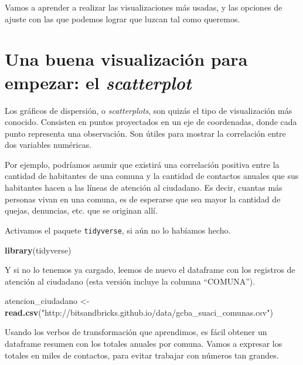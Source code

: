 \documentclass[spanish,]{book}
\newenvironment{Shaded}{\begin{snugshade}}{\end{snugshade}}
\newcommand{\KeywordTok}[1]{\textcolor[rgb]{0.13,0.29,0.53}{\textbf{#1}}}
\newcommand{\NormalTok}[1]{#1}
\newcommand{\StringTok}[1]{\textcolor[rgb]{0.31,0.60,0.02}{#1}}
\begin{document}
Vamos a aprender a realizar las visualizaciones más usadas, y las opciones de ajuste con las que podemos lograr que luzcan tal como queremos.

\hypertarget{una-buena-visualizaciuxf3n-para-empezar-el-scatterplot}{%
\section{\texorpdfstring{Una buena visualización para empezar: el \emph{scatterplot}}{Una buena visualización para empezar: el scatterplot}}\label{una-buena-visualizaciuxf3n-para-empezar-el-scatterplot}}

Los gráficos de dispersión, o \emph{scatterplots}, son quizás el tipo de visualización más conocido. Consisten en puntos proyectados en un eje de coordenadas, donde cada punto representa una observación. Son útiles para mostrar la correlación entre dos variables numéricas.

Por ejemplo, podríamos asumir que existirá una correlación positiva entre la cantidad de habitantes de una comuna y la cantidad de contactos anuales que sus habitantes hacen a las líneas de atención al ciudadano. Es decir, cuantas más personas vivan en una comuna, es de esperarse que sea mayor la cantidad de quejas, denuncias, etc. que se originan allí.

Activamos el paquete \texttt{tidyverse}, si aún no lo habíamos hecho.

\begin{Shaded}
\begin{Highlighting}[]
\KeywordTok{library}\NormalTok{(tidyverse)}
\end{Highlighting}
\end{Shaded}

Y si no lo tenemos ya cargado, leemos de nuevo el dataframe con los registros de atención al ciudadano (esta versión incluye la columna ``COMUNA'').

\begin{Shaded}
\begin{Highlighting}[]
\NormalTok{atencion_ciudadano <-}\StringTok{ }\KeywordTok{read.csv}\NormalTok{(}\StringTok{"http://bitsandbricks.github.io/data/gcba_suaci_comunas.csv"}\NormalTok{)}
\end{Highlighting}
\end{Shaded}

Usando los verbos de transformación que aprendimos, es fácil obtener un dataframe resumen con los totales anuales por comuna. Vamos a expresar los totales en miles de contactos, para evitar trabajar con números tan grandes.
\end{document}
